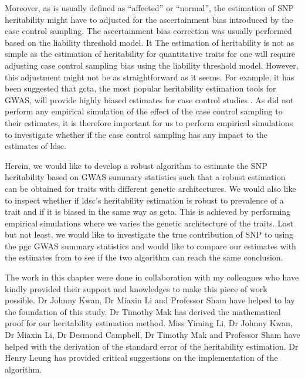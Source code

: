 	Moreover, as  is usually defined as ``affected'' or ``normal'', the estimation of \gls{SNP} heritability might have to adjusted for the ascertainment bias introduced by the case control sampling. 
	The ascertainment bias correction was usually performed based on the liability threshold model.
	It 
	The estimation of heritability is not as simple as the estimation of heritability for quantitative traits for one will require adjusting case control sampling bias using the liability threshold model.
	However, this adjustment might not be as straightforward as it seems.
	For example, it has been suggested that \gls{gcta}, the most popular heritability estimation tools for \gls{GWAS}, will provide highly biased estimates for case control studies \citep{Golan2014}.
	As \citet{Bulik-Sullivan2015} did not perform any empirical simulation of the effect of the case control sampling to their estimates, it is therefore important for us to perform empirical simulations to investigate whether if the case control sampling has any impact to the estimates of \gls{ldsc}.
	
	Herein, we would like to develop a robust algorithm to estimate the \gls{SNP} heritability based on \gls{GWAS} summary statistics such that a robust estimation can be obtained for traits with different genetic architectures. 
	We would also like to inspect whether if \gls{ldsc}'s heritability estimation is robust to prevalence of a trait and if it is biased in the same way as \gls{gcta}.
	This is achieved by performing empirical simulations where we varies the genetic architecture of the traits.
	Last but not least, we would like to investigate the true contribution of \gls{SNP} to  using the \gls{pgc}  \gls{GWAS} summary statistics and would like to compare our estimates with the estimates from \citet{Bulik-Sullivan2015} to see if the two algorithm can reach the same conclusion.
	
	The work in this chapter were done in collaboration with my colleagues who have kindly provided their support and knowledges to make this piece of work possible.
	Dr Johnny Kwan, Dr Miaxin Li and Professor Sham have helped to lay the foundation of this study. 
	Dr Timothy Mak has derived the mathematical proof for our heritability estimation method. 
	Miss Yiming Li, Dr Johnny Kwan, Dr Miaxin Li, Dr Desmond Campbell, Dr Timothy Mak and Professor Sham have helped with the derivation of the standard error of the heritability estimation. 
	Dr Henry Leung has provided critical suggestions on the implementation of the algorithm.
	
